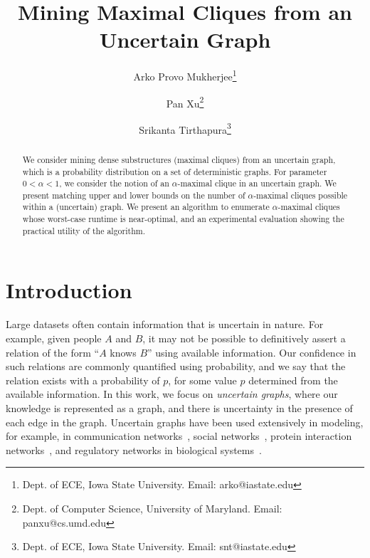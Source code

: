 \documentclass[11pt,letterpaper]{article}
\begin{document}
\date{}

\title{\bf Mining Maximal Cliques from an Uncertain Graph
}

\author{
Arko Provo Mukherjee\thanks{
Dept. of ECE, Iowa State University.
Email: arko@iastate.edu
}
\and 
Pan Xu\thanks{
Dept. of Computer Science, University of Maryland.
Email: panxu@cs.umd.edu
}
\and 
Srikanta Tirthapura\thanks{
Dept. of ECE, Iowa State University.
Email: snt@iastate.edu
}
}

\maketitle

\doublespacing

\begin{abstract} 
We consider mining dense substructures (maximal cliques) from an uncertain graph, which is a probability distribution on a set of deterministic graphs. For parameter $0 < \alpha < 1$, we consider the notion of an $\alpha$-maximal clique in an uncertain graph. We present matching upper and lower bounds on the number of $\alpha$-maximal cliques possible within a (uncertain) graph. We present an algorithm to enumerate $\alpha$-maximal cliques whose worst-case runtime is near-optimal, and an experimental evaluation showing the practical utility of the algorithm.
\end{abstract}

\section{Introduction}
\label{sec:intro}
Large datasets often contain information that is uncertain in nature. For example, given people $A$ and $B$, it may not be possible to definitively assert a relation of the form ``$A$ knows $B$'' using available information. Our confidence in such relations are commonly quantified using probability, and we say that the relation exists with a probability of $p$, for some value $p$ determined from the available information. In this work, we focus on {\em uncertain graphs}, where our knowledge is represented as a graph, and there is uncertainty in the presence of each edge in the graph. Uncertain graphs have been used extensively in modeling, for example, in communication networks~\cite{GNSC2007,BM2005,KTMN2005}, social networks~\cite{AR2007,GKRT2004,KKT2003,LK2003,KG2010,BBGT2012}, protein interaction networks~\cite{AKGR2004,BCRC2004,RTVMBKGPC2005}, and regulatory networks in biological systems~\cite{JTCS2006}.
\end{document}
